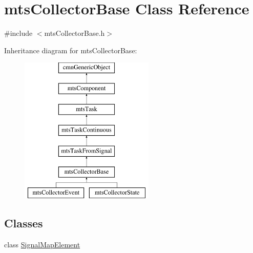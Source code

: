 \hypertarget{classmts_collector_base}{}\section{mts\+Collector\+Base Class Reference}
\label{classmts_collector_base}


{\ttfamily \#include $<$mts\+Collector\+Base.\+h$>$}

Inheritance diagram for mts\+Collector\+Base\+:\begin{figure}[H]
\begin{center}
\leavevmode
\includegraphics[height=7.000000cm]{d9/d5d/classmts_collector_base}
\end{center}
\end{figure}
\subsection*{Classes}
\begin{DoxyCompactItemize}
\item 
class \hyperlink{classmts_collector_base_1_1_signal_map_element}{Signal\+Map\+Element}
\end{DoxyCompactItemize}
